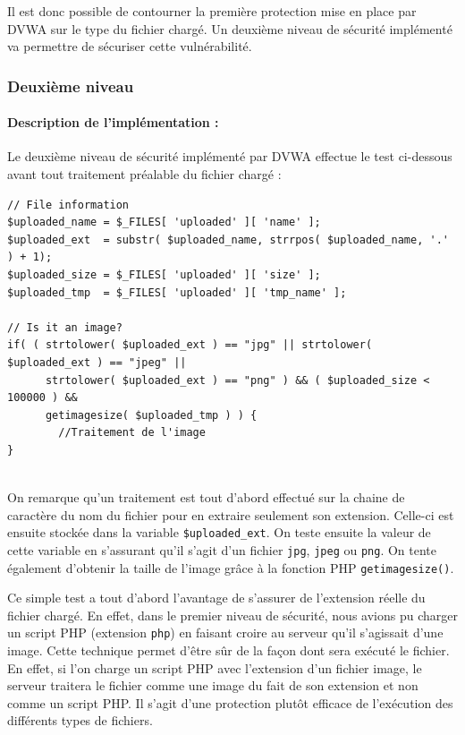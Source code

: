 Il est donc possible de contourner la première protection mise en place par DVWA sur le type du fichier chargé. Un deuxième niveau de sécurité implémenté va permettre de sécuriser cette vulnérabilité.


\subsubsection{Deuxième niveau}

\paragraph{Description de l'implémentation :}

Le deuxième niveau de sécurité implémenté par DVWA effectue le test ci-dessous avant tout traitement préalable du fichier chargé :


\begin{lstlisting}
// File information
$uploaded_name = $_FILES[ 'uploaded' ][ 'name' ];
$uploaded_ext  = substr( $uploaded_name, strrpos( $uploaded_name, '.' ) + 1);
$uploaded_size = $_FILES[ 'uploaded' ][ 'size' ];
$uploaded_tmp  = $_FILES[ 'uploaded' ][ 'tmp_name' ];

// Is it an image?
if( ( strtolower( $uploaded_ext ) == "jpg" || strtolower( $uploaded_ext ) == "jpeg" || 
      strtolower( $uploaded_ext ) == "png" ) && ( $uploaded_size < 100000 ) &&
      getimagesize( $uploaded_tmp ) ) {
        //Traitement de l'image
}
        
\end{lstlisting}

On remarque qu'un traitement est tout d'abord effectué sur la chaine de caractère du nom du fichier pour en extraire seulement son extension. Celle-ci est ensuite stockée dans la variable \texttt{\$uploaded\_ext}. On teste ensuite la valeur de cette variable en s'assurant qu'il s'agit d'un fichier \texttt{jpg}, \texttt{jpeg} ou \texttt{png}. On tente également d'obtenir la taille de l'image grâce à la fonction PHP \texttt{getimagesize()}.

Ce simple test a tout d'abord l'avantage de s'assurer de l'extension réelle du fichier chargé. En effet, dans le premier niveau de sécurité, nous avions pu charger un script PHP (extension \texttt{php}) en faisant croire au serveur qu'il s'agissait d'une image. Cette technique permet d'être sûr de la façon dont sera exécuté le fichier. En effet, si l'on charge un script PHP avec l'extension d'un fichier image, le serveur traitera le fichier comme une image du fait de son extension et non comme un script PHP. Il s'agit d'une protection plutôt efficace de l'exécution des différents types de fichiers.

